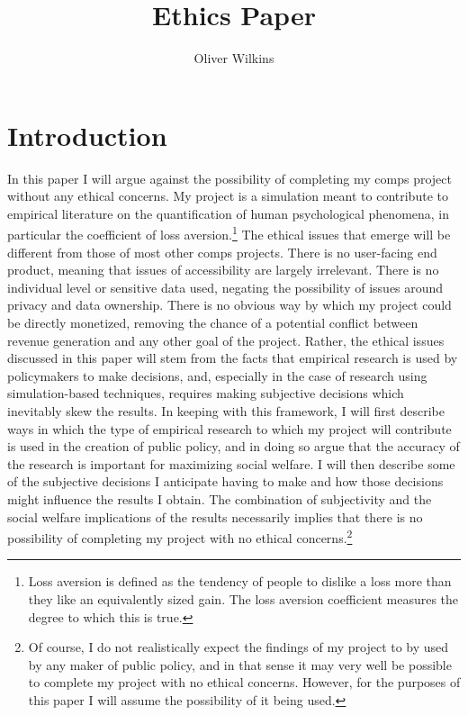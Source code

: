 \documentclass[10pt,twocolumn]{article}
\title{Ethics Paper}
\author{Oliver Wilkins}
\affiliation{Occidental College}
\begin{document}
\maketitle

\section{Introduction}
In this paper I will argue against the possibility of completing my comps project without any ethical concerns. My project is a simulation meant to contribute to empirical literature on the quantification of human psychological phenomena, in particular the coefficient of loss aversion.\footnote{Loss aversion is defined as the tendency of people to dislike a loss more than they like an equivalently sized gain. The loss aversion coefficient measures the degree to which this is true.} The ethical issues that emerge will be different from those of most other comps projects. There is no user-facing end product, meaning that issues of accessibility are largely irrelevant. There is no individual level or sensitive data used, negating the possibility of issues around privacy and data ownership. There is no obvious way by which my project could be directly monetized, removing the chance of a potential conflict between revenue generation and any other goal of the project. Rather, the ethical issues discussed in this paper will stem from the facts that empirical research is used by policymakers to make decisions, and, especially in the case of research using simulation-based techniques, requires making subjective decisions which inevitably skew the results. In keeping with this framework, I will first describe ways in which the type of empirical research to which my project will contribute is used in the creation of public policy, and in doing so argue that the accuracy of the research is important for maximizing social welfare. I will then describe some of the subjective decisions I anticipate having to make and how those decisions might influence the results I obtain. The combination of subjectivity and the social welfare implications of the results necessarily implies that there is no possibility of completing my project with no ethical concerns.\footnote{Of course, I do not realistically expect the findings of my project to by used by any maker of public policy, and in that sense it may very well be possible to complete my project with no ethical concerns. However, for the purposes of this paper I will assume the possibility of it being used.}
\end{document}

